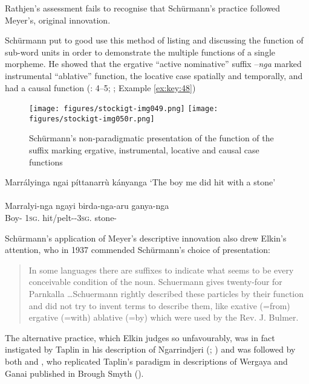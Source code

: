 Rathjen’s assessment fails to recognise that Schürmann’s practice followed Meyer’s, original innovation.

Schürmann put to good use this method of listing and discussing the function of sub-word units in order to demonstrate the multiple functions of a single morpheme. He showed that the ergative “active nominative” suffix –\textit{nga} marked instrumental “ablative” function, the locative case spatially and temporally, and had a causal function (\citeyear{schurmann_letter_1844}: 4--5; ; Example \ref{ex:key:48})


\begin{figure}
\texttt{[image: figures/stockigt-img049.png]}
\texttt{[image: figures/stockigt-img050r.png]}
\caption{Schürmann’s non-paradigmatic presentation of the function of the suffix marking ergative, instrumental, locative and causal case functions \citeyearpar[4–5]{schurmann_vocabulary_1844}}
\label{fig:key:107}
\end{figure}

\ea\label{ex:key:48}
Marrályinga ngai píttanarrù kányanga
\glt `The boy me did hit with a stone'\\
\citep[5]{schurmann_vocabulary_1844} \\
\gll Marralyi-nga ngayi birda-nga-aru ganya-nga \\
Boy- 1\textsc{sg}.  hit/pelt--3\textsc{sg}. stone- \\
\z

Schürmann’s application of Meyer’s descriptive innovation also drew Elkin’s attention, who in 1937 commended Schürmann’s choice of presentation:

\begin{quote}
	In some languages there are suffixes to indicate what seems to be every conceivable condition of the noun. Schuermann gives twenty-four for Parnkalla …Schuermann rightly described these particles by their function and did not try to invent terms to describe them, like exative (=from) ergative (=with) ablative (=by) which were used by the Rev. J. Bulmer. \citep[150]{elkin_nature_1937}
\end{quote}

 The alternative practice, which Elkin judges so unfavourably, was in fact instigated by Taplin in his description of Ngarrindjeri (\citeyear{taplin_notes_1872}; \citeyear{taplin_grammar_1878}) and was followed by both \citet{hagenauer_language_1878} and \citet{bulmer_language_1878}, who replicated Taplin’s paradigm in descriptions of Wergaya and Ganai published in Brough Smyth ().


